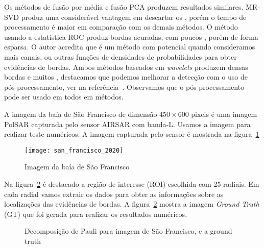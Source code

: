 Os métodos de fusão por média e fusão PCA produzem resultados similares. MR-SVD produz uma considerável vantagem em descartar os  , porém o tempo de processamento é maior em comparação com os demais métodos. O método usando a estatística ROC produz bordas acuradas, com poucos , porém de forma esparsa. O autor acredita que é um método com potencial quando consideramos mais canais, ou outras funções de densidades de probabilidades para obter evidências de bordas. Ambos métodos baseados em \textit{wavelets} produzem densas bordas e muitos , destacamos que podemos melhorar a detecção com o uso de pós-processamento, ver na referência~\cite{fbgm}. Observamos que o pós-processamento pode ser usado em todos em métodos. 

A imagem da baía de São Francisco de dimensão $450\times 600$ pixeis é uma imagem PolSAR capturada pelo sensor AIRSAR com banda-L. Usamos a imagem para realizar teste numéricos. A imagem capturada pelo sensor é mostrada na figura~\ref{san_francisco}
\begin{figure}[hbt]
	\centering
	\vspace{-2.5cm}
	\texttt{[image: san\_francisco\_2020]}%
    \vspace{-3.2cm}
	\caption{Imagem da baía de São Francisco}
\label{san_francisco}
\end{figure}

Na figura~\ref{roi_san_fran_gt} é destacado a região de interesse (ROI) escolhida com 25 radiais. Em cada radial vamos extrair os dados para obter as informações sobre as localizações das evidências de bordas. A figura~\ref{roi_san_fran_gt} mostra a imagem \textit{Ground Truth} (GT) que foi gerada para realizar os resultados numéricos.  
\begin{figure}[hbt]
   \centering
     \caption{Decomposição de Pauli para imagem de São Francisco, e a ground truth}
    \label{roi_san_fran_gt}
\end{figure}


